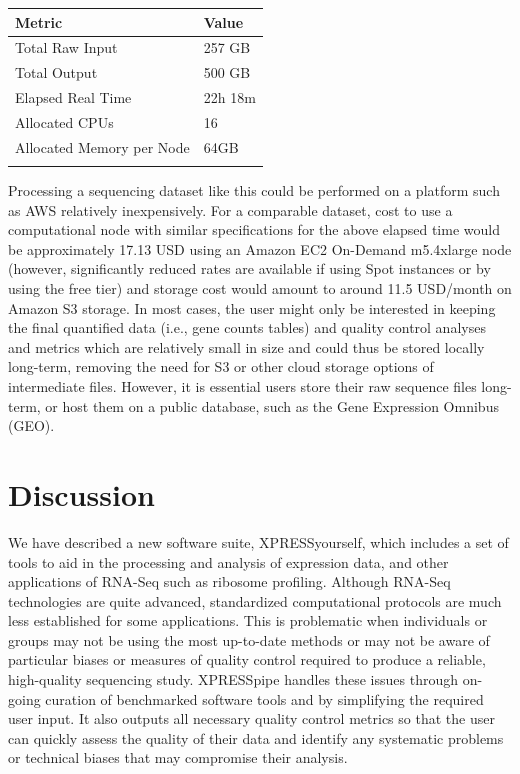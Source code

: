 \documentclass[10pt, oneside]{article}
\begin{document}
\begin{multicols}{2}
\begin{table}[!]
    \centering
{}
\begin{tabular}{p{5cm}p{3cm}}
\textbf{Metric} & \textbf{Value} \\
 \hline
 Total Raw Input & 257 GB \\
 \hline
 Total Output & 500 GB \\
 \hline
 Elapsed Real Time & 22h 18m \\
 \hline
 Allocated CPUs & 16 \\
 \hline
 Allocated Memory per Node & 64GB \\
 \label{tab:chpc_performance}
\end{tabular}
\end{table}

Processing a sequencing dataset like this could be performed on a platform such as AWS relatively inexpensively. For a comparable dataset, cost to use a computational node with similar specifications for the above elapsed time would be approximately 17.13 USD using an Amazon EC2 On-Demand m5.4xlarge node (however, significantly reduced rates are available if using Spot instances or by using the free tier) and storage cost would amount to around 11.5 USD/month on Amazon S3 storage. In most cases, the user might only be interested in keeping the final quantified data (i.e., gene counts tables) and quality control analyses and metrics which are relatively small in size and could thus be stored locally long-term, removing the need for S3 or other cloud storage options of intermediate files. However, it is essential users store their raw sequence files long-term, or host them on a public database, such as the Gene Expression Omnibus (GEO). \par


\section*{Discussion}
We have described a new software suite, XPRESSyourself, which includes a set of tools to aid in the processing and analysis of expression data, and other applications of RNA-Seq such as ribosome profiling. Although RNA-Seq technologies are quite advanced, standardized computational protocols are much less established for some applications. This is problematic when individuals or groups may not be using the most up-to-date methods or may not be aware of particular biases or measures of quality control required to produce a reliable, high-quality sequencing study. XPRESSpipe handles these issues through on-going curation of benchmarked software tools and by simplifying the required user input. It also outputs all necessary quality control metrics so that the user can quickly assess the quality of their data and identify any systematic problems or technical biases that may compromise their analysis. \par


\end{multicols}
\end{document}
